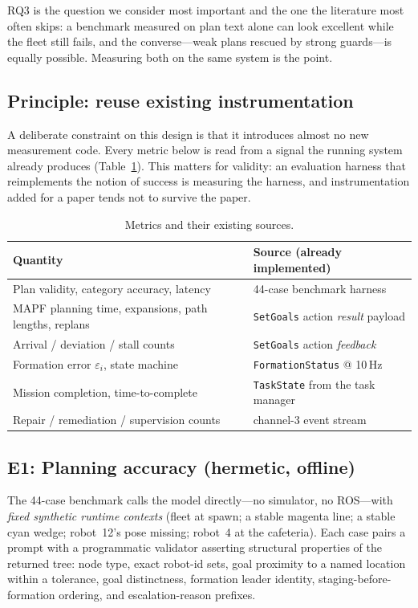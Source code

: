 \documentclass[10pt,twocolumn]{article}
\newcommand{\code}[1]{\texttt{\small #1}}
\begin{document}
RQ3 is the question we consider most important and the one the literature most
often skips: a benchmark measured on plan text alone can look excellent while
the fleet still fails, and the converse---weak plans rescued by strong
guards---is equally possible. Measuring both on the same system is the point.

\subsection{Principle: reuse existing instrumentation}

A deliberate constraint on this design is that it introduces almost no new
measurement code. Every metric below is read from a signal the running system
already produces (Table~\ref{tab:metrics}). This matters for validity: an
evaluation harness that reimplements the notion of success is measuring the
harness, and instrumentation added for a paper tends not to survive the paper.

\begin{table}[t]
\centering\small
\caption{Metrics and their existing sources.}
\label{tab:metrics}
\begin{tabular}{@{}p{3.3cm}p{4.4cm}@{}}
\toprule
\textbf{Quantity} & \textbf{Source (already implemented)} \\
\midrule
Plan validity, category accuracy, latency & 44-case benchmark harness \\
MAPF planning time, expansions, path lengths, replans & \code{SetGoals} action \emph{result} payload \\
Arrival / deviation / stall counts & \code{SetGoals} action \emph{feedback} \\
Formation error $\varepsilon_i$, state machine & \code{FormationStatus} @ 10\,Hz \\
Mission completion, time-to-complete & \code{TaskState} from the task manager \\
Repair / remediation / supervision counts & channel-3 event stream \\
\bottomrule
\end{tabular}
\end{table}

\subsection{E1: Planning accuracy (hermetic, offline)}
\label{sec:e1}

The 44-case benchmark calls the model directly---no simulator, no ROS---with
\emph{fixed synthetic runtime contexts} (fleet at spawn; a stable magenta line;
a stable cyan wedge; robot~12's pose missing; robot~4 at the cafeteria). Each
case pairs a prompt with a programmatic validator asserting structural
properties of the returned tree: node type, exact robot-id sets, goal proximity
to a named location within a tolerance, goal distinctness, formation leader
identity, staging-before-formation ordering, and escalation-reason prefixes.
\end{document}
